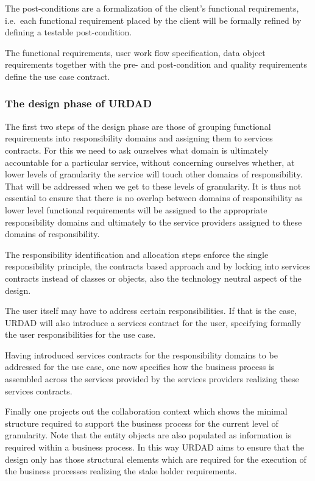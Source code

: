 \documentclass{IOS-Book-Article}
\begin{document}
The post-conditions are a formalization of the client's functional requirements,
i.e.\ each functional requirement placed by the client will be formally refined
by defining a testable post-condition.

The functional requirements, user work flow specification, data object requirements
together with the pre- and post-condition and quality requirements define the
use case contract.


\subsubsection{The design phase of URDAD}

The first two steps of the design phase are those of grouping functional
requirements into responsibility domains and assigning them to services
contracts. For this we need to ask ourselves what domain is ultimately
accountable for a particular service, without concerning ourselves whether,
at lower levels of granularity the service will touch other domains of
responsibility. That will be addressed when we get to these levels of
granularity. It is thus not essential to ensure that
there is no overlap between domains of responsibility as
lower level functional requirements will be assigned to the appropriate responsibility
domains and ultimately to the service providers assigned to these domains of responsibility.


The responsibility identification and allocation steps enforce the single responsibility principle, the
contracts based approach and by locking into services contracts instead of
classes or objects, also the technology neutral aspect of the design.


The user itself may have to address certain responsibilities. If that is the
case, URDAD will also introduce a services contract for the user, specifying
formally the user responsibilities for the use case.

Having introduced services contracts for the responsibility domains to
be addressed for the use case, one now specifies how the business process is
assembled across the services provided by the services providers realizing these
services contracts.

Finally one projects out the collaboration context which shows the minimal structure
required to support the business process for the current level of granularity. Note
that the entity objects are also populated as information is required within a business
process. In this way URDAD aims to ensure that the design only has those structural
elements which are required for the execution of the business processes realizing the
stake holder requirements.
\end{document}
